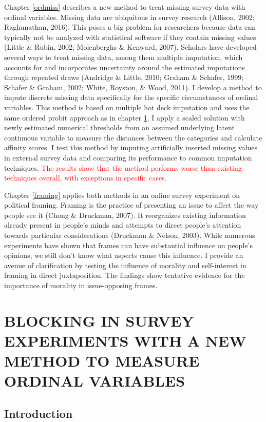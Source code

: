 \documentclass[12pt,econ]{sources/authesis}
\begin{document}
Chapter \ref{ordmiss} describes a new method to treat missing survey data with ordinal variables. Missing data are ubiquitous in survey research (Allison, 2002; Raghunathan, 2016). This poses a big problem for researchers because data can typically not be analyzed with statistical software if they contain missing values (Little \& Rubin, 2002; Molenberghs \& Kenward, 2007). Scholars have developed several ways to treat missing data, among them multiple imputation, which accounts for and incorporates uncertainty around the estimated imputations through repeated draws (Andridge \& Little, 2010; Graham \& Schafer, 1999; Schafer \& Graham, 2002; White, Royston, \& Wood, 2011). I develop a method to impute discrete missing data specifically for the specific circumstances of ordinal variables. This method is based on multiple hot deck imputation and uses the same ordered probit approach as in chapter \ref{ordblock}. I apply a scaled solution with newly estimated numerical thresholds from an assumed underlying latent continuous variable to measure the distances between the categories and calculate affinity scores. I test this method by imputing artificially inserted missing values in external survey data and comparing its performance to common imputation techniques. \textcolor{red}{The results show that the method performs worse than existing techniques overall, with exceptions in specific cases.}

Chapter \ref{framing} applies both methods in an online survey experiment on political framing. Framing is the practice of presenting an issue to affect the way people see it (Chong \& Druckman, 2007). It reorganizes existing information already present in people's minds and attempts to direct people's attention towards particular considerations (Druckman \& Nelson, 2003). While numerous experiments have shown that frames can have substantial influence on people's opinions, we still don't know what aspects cause this influence. I provide an avenue of clarification by testing the influence of morality and self-interest in framing in direct juxtaposition. The findings show tentative evidence for the importance of morality in issue-opposing frames.

\hypertarget{ordblock}{%
\chapter{BLOCKING IN SURVEY EXPERIMENTS WITH A NEW METHOD TO MEASURE ORDINAL VARIABLES}\label{ordblock}}

\hypertarget{ordblock-intro}{%
\section{Introduction}\label{ordblock-intro}}
\end{document}
